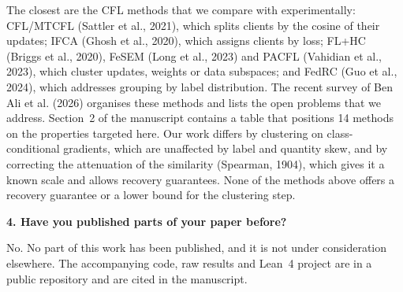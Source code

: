 \documentclass[10pt]{article}
\begin{document}
The closest are the CFL methods that we compare with experimentally: CFL/MTCFL (Sattler et al., 2021), which splits clients by the cosine of their updates; IFCA (Ghosh et al., 2020), which assigns clients by loss; FL+HC (Briggs et al., 2020), FeSEM (Long et al., 2023) and PACFL (Vahidian et al., 2023), which cluster updates, weights or data subspaces; and FedRC (Guo et al., 2024), which addresses grouping by label distribution. The recent survey of Ben Ali et al. (2026) organises these methods and lists the open problems that we address. Section~2 of the manuscript contains a table that positions 14 methods on the properties targeted here. Our work differs by clustering on class-conditional gradients, which are unaffected by label and quantity skew, and by correcting the attenuation of the similarity (Spearman, 1904), which gives it a known scale and allows recovery guarantees. None of the methods above offers a recovery guarantee or a lower bound for the clustering step.

\textbf{4. Have you published parts of your paper before?}

No. No part of this work has been published, and it is not under consideration elsewhere. The accompanying code, raw results and Lean~4 project are in a public repository and are cited in the manuscript.
\end{document}
